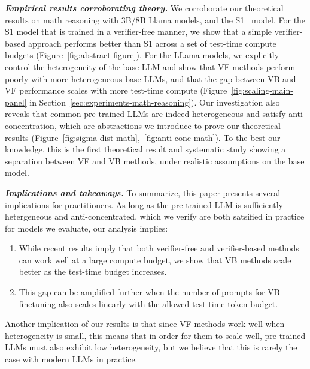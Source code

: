 \emph{\textbf{Empirical results corroborating theory.}} We corroborate our theoretical results on math reasoning with 3B/8B Llama models, and the S1~\cite{muennighoff2025s1} model. For the S1 model that is trained in a verifier-free manner, we show that a simple verifier-based approach performs better than S1 across  a set of test-time compute budgets (Figure~\ref{fig:abstract-figure}). For the LLama models, we  explicitly control the heterogeneity of the base LLM and show that VF methods perform poorly with more heterogeneous base LLMs, and that the gap between VB and VF performance scales with more test-time compute (Figure~\ref{fig:scaling-main-panel} in Section~\ref{sec:experiments-math-reasoning}). Our investigation also reveals that common pre-trained LLMs are indeed heterogeneous and satisfy anti-concentration, which are abstractions we introduce to prove our theoretical results (Figure~\ref{fig:sigma-dist-math},~\ref{fig:anti-conc-math}).
To the best our knowledge, this is the first theoretical result and systematic study showing a separation between VF and VB methods, under realistic assumptions on the base model.

\emph{\textbf{Implications and takeaways.}} To summarize, this paper presents several implications for practitioners. As long as the pre-trained LLM is sufficiently hetergeneous and anti-concentrated, which we verify are both satsified in practice for models we evaluate, our analysis implies:
\vspace{-0.1cm}
\begin{enumerate}[topsep=0pt,parsep=0pt, after=\vspace{-0.22\baselineskip}]
    \item While recent results imply that both verifier-free and verifier-based methods can work well at a large compute budget, we show that VB methods scale better as the test-time budget increases.
    \item This gap can be amplified further when the number of prompts for VB finetuning also scales linearly with the allowed test-time token budget.
\end{enumerate}
Another implication of our results is that since VF methods work well when heterogeneity is small, this means that in order for them to scale well, pre-trained LLMs must also exhibit low heterogeneity, but we believe that this is rarely the case with modern LLMs in practice.
